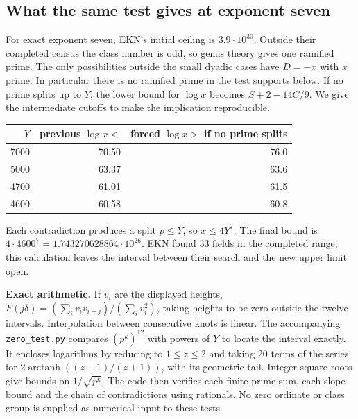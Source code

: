 \subsection{What the same test gives at exponent seven}
For exact exponent seven, EKN's initial ceiling is $3.9\cdot10^{30}$. Outside their completed census the class number is odd, so genus theory gives one ramified prime. The only possibilities outside the small dyadic cases have $D=-x$ with $x$ prime. In particular there is no ramified prime in the test supports below. If no prime splits up to $Y$, the lower bound for $\log x$ becomes $S+2-14C/9$. We give the intermediate cutoffs to make the implication reproducible.
\begin{center}\begin{tabular}{rrr}\toprule
$Y$ & previous $\log x<$ & forced $\log x>$ if no prime splits\\\midrule
7000 & 70.50 & 76.0\\
5000 & 63.37 & 63.6\\
4700 & 61.01 & 61.5\\
4600 & 60.58 & 60.8\\\bottomrule
\end{tabular}\end{center}
Each contradiction produces a split $p\le Y$, so $x\le 4Y^7$. The final bound is $4\cdot4600^7=1.743270628864\cdot10^{26}$. EKN found 33 fields in the completed range; this calculation leaves the interval between their search and the new upper limit open.

\medskip\noindent\textbf{Exact arithmetic.}
If $v_i$ are the displayed heights, $F(j\delta)=
(\sum_i v_i v_{i+j})/(\sum_i v_i^2)$, taking heights to be zero
outside the twelve intervals. Interpolation between consecutive knots
is linear. The accompanying \texttt{zero\_test.py} compares
$(p^k)^{12}$ with powers of $Y$ to locate the interval exactly. It
encloses logarithms by reducing to $1\le z\le2$ and taking 20 terms
of the series for $2\operatorname{arctanh}((z-1)/(z+1))$, with its
geometric tail. Integer square roots give bounds on $1/\sqrt{p^k}$.
The code then verifies each finite prime sum, each slope bound and
the chain of contradictions using rationals. No zero ordinate or class
group is supplied as numerical input to these tests.
